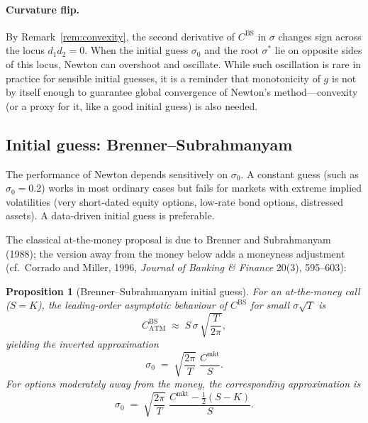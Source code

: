 \documentclass[11pt,a4paper]{article}
\theoremstyle{plain}
\newtheorem{proposition}[theorem]{Proposition}
\theoremstyle{definition}
\theoremstyle{remark}
\newcommand{\BS}{\mathrm{BS}}
\begin{document}
\paragraph{Curvature flip.}
By Remark~\ref{rem:convexity}, the second derivative of \(C^{\BS}\) in
\(\sigma\) changes sign across the locus \(d_1 d_2 = 0\). When the
initial guess \(\sigma_0\) and the root \(\sigma^*\) lie on opposite
sides of this locus, Newton can overshoot and oscillate. While such
oscillation is rare in practice for sensible initial guesses, it is
a reminder that monotonicity of \(g\) is not by itself enough to
guarantee global convergence of Newton's method---convexity (or a
proxy for it, like a good initial guess) is also needed.

\subsection{Initial guess: Brenner--Subrahmanyam}

The performance of Newton depends sensitively on \(\sigma_0\). A
constant guess (such as \(\sigma_0 = 0.2\)) works in most ordinary
cases but fails for markets with extreme implied volatilities (very
short-dated equity options, low-rate bond options, distressed assets).
A data-driven initial guess is preferable.

The classical at-the-money proposal is due to Brenner and Subrahmanyam
(1988); the version away from the money below adds a moneyness
adjustment (cf.\ Corrado and Miller, 1996, \emph{Journal of Banking
\& Finance} 20(3), 595--603):

\begin{proposition}[Brenner--Subrahmanyam initial guess]
\label{prop:bs-guess}
For an at-the-money call (\(S = K\)), the leading-order asymptotic
behaviour of \(C^{\BS}\) for small \(\sigma\sqrt{T}\) is
\begin{equation}
    C^{\BS}_{\mathrm{ATM}}
    \;\approx\; S\,\sigma\,\sqrt{\frac{T}{2\pi}},
    \label{eq:atm-asymptotic}
\end{equation}
yielding the inverted approximation
\begin{equation}
    \sigma_0 \;=\; \sqrt{\frac{2\pi}{T}}\;\frac{C^{\mathrm{mkt}}}{S}.
    \label{eq:bs-guess-atm}
\end{equation}
For options moderately away from the money, the corresponding
approximation is
\begin{equation}
    \sigma_0 \;=\; \sqrt{\frac{2\pi}{T}}\;
                   \frac{C^{\mathrm{mkt}} - \tfrac{1}{2}(S - K)}{S}.
    \label{eq:bs-guess-general}
\end{equation}
\end{proposition}
\end{document}
